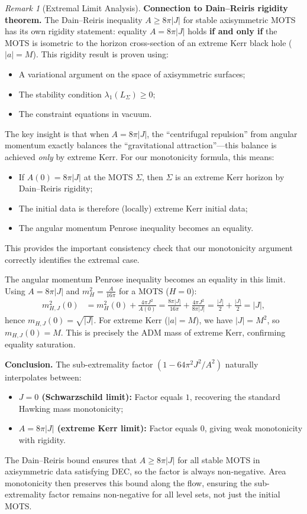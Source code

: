 \documentclass[12pt]{article}
\theoremstyle{plain}
\theoremstyle{definition}
\theoremstyle{remark}
\newtheorem{remark}[theorem]{Remark}
\begin{document}
\begin{remark}[Extremal Limit Analysis]
\textbf{Connection to Dain--Reiris rigidity theorem.} The Dain--Reiris inequality $A \geq 8\pi|J|$ for stable axisymmetric MOTS \cite[Theorem~1]{dain2011} has its own rigidity statement: equality $A = 8\pi|J|$ holds \textbf{if and only if} the MOTS is isometric to the horizon cross-section of an extreme Kerr black hole ($|a| = M$). This rigidity result is proven using:
\begin{itemize}
    \item A variational argument on the space of axisymmetric surfaces;
    \item The stability condition $\lambda_1(L_\Sigma) \geq 0$;
    \item The constraint equations in vacuum.
\end{itemize}
The key insight is that when $A = 8\pi|J|$, the ``centrifugal repulsion'' from angular momentum exactly balances the ``gravitational attraction''---this balance is achieved \textit{only} by extreme Kerr. For our monotonicity formula, this means:
\begin{itemize}
    \item If $A(0) = 8\pi|J|$ at the MOTS $\Sigma$, then $\Sigma$ is an extreme Kerr horizon by Dain--Reiris rigidity;
    \item The initial data is therefore (locally) extreme Kerr initial data;
    \item The angular momentum Penrose inequality becomes an equality.
\end{itemize}
This provides the important consistency check that our monotonicity argument correctly identifies the extremal case.

The angular momentum Penrose inequality becomes an equality in this limit. Using $A = 8\pi|J|$ and $m_H^2 = \frac{A}{16\pi}$ for a MOTS ($H = 0$):
\begin{align*}
m_{H,J}^2(0) &= m_H^2(0) + \frac{4\pi J^2}{A(0)} = \frac{8\pi|J|}{16\pi} + \frac{4\pi J^2}{8\pi|J|} = \frac{|J|}{2} + \frac{|J|}{2} = |J|,
\end{align*}
hence $m_{H,J}(0) = \sqrt{|J|}$. For extreme Kerr ($|a| = M$), we have $|J| = M^2$, so $m_{H,J}(0) = M$. This is precisely the ADM mass of extreme Kerr, confirming equality saturation.

\textbf{Conclusion.} The sub-extremality factor $(1 - 64\pi^2 J^2/A^2)$ naturally interpolates between:
\begin{itemize}
    \item \textbf{$J = 0$ (Schwarzschild limit):} Factor equals $1$, recovering the standard Hawking mass monotonicity;
    \item \textbf{$A = 8\pi|J|$ (extreme Kerr limit):} Factor equals $0$, giving weak monotonicity with rigidity.
\end{itemize}
The Dain--Reiris bound ensures that $A \geq 8\pi|J|$ for all stable MOTS in axisymmetric data satisfying DEC, so the factor is always non-negative. Area monotonicity then preserves this bound along the flow, ensuring the sub-extremality factor remains non-negative for all level sets, not just the initial MOTS.
\end{remark}
\end{document}
